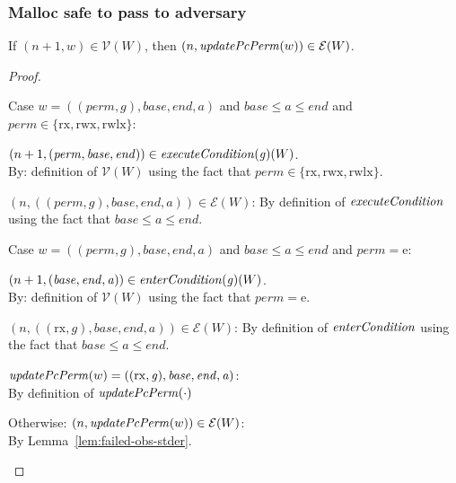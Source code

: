 \documentclass[a4paper]{article}
\newcommand{\var}[1]{\mathit{#1}}
\newcommand{\gl}{\var{g}}
\newcommand{\addr}{\var{a}}
\newcommand{\start}{\var{base}}
\newcommand{\addrend}{\var{end}}
\newcommand{\perm}{\var{perm}}
\newcommand{\stdcap}[1][(\perm,\gl)]{\left(#1,\start,\addrend,\addr \right)}
\newcommand{\plainfun}[2]{
  \ifthenelse{\equal{#2}{}}
  {\mathit{#1}}
  {\mathit{#1}(#2)}
}
\newcommand{\updatePcPerm}[1]{\plainfun{updatePcPerm}{#1}}
\newcommand{\execCond}[1]{\plainfun{executeCondition}{#1}}
\newcommand{\entryCond}[1]{\plainfun{enterCondition}{#1}}
\newcommand{\asmType}{\plaindom{AsmType}}
\newcommand{\plaindom}[1]{\mathrm{#1}}
\newcommand{\intr}[2]{\mathcal{#1}}
\newcommand{\valueintr}[1]{\intr{V}{#1}}
\newcommand{\exprintr}[1]{\intr{E}{#1}}
\newcommand{\stdvr}{\valueintr{\asmType}}
\newcommand{\stder}{\exprintr{\asmType}}
\newcommand{\npair}[2][n]{\left(#1,#2 \right)}
\newcommand{\plainperm}[1]{\mathrm{#1}}
\newcommand{\exec}{\plainperm{rx}}
\newcommand{\entry}{\plainperm{e}}
\newcommand{\rwx}{\plainperm{rwx}}
\newcommand{\rwlx}{\plainperm{rwlx}}
\begin{document}
\subsubsection{Malloc safe to pass to adversary}
\label{sec:malloc-valrel}

\begin{lemma}
  \label{lem:safe-values-safe-invoke}
  If $\npair[n+1]{w} \in \stdvr(W)$, then $\npair{\updatePcPerm{w}} \in \stder(W)$.
\end{lemma}
\begin{proof}
  \begin{enumproof}
  \item Case $w = \stdcap$ and $\start \leq \addr \leq \addrend$
    and $\perm \in \{ \exec,\rwx, \rwlx \}$:
    \begin{enumproof}
    \item $\npair[n+1]{(\perm,\start,\addrend)}\in\execCond{\gl}(W)$.\\
      By: definition of $\stdvr(W)$ using the fact that $\perm \in \{ \exec,\rwx, \rwlx \}$.
    \item $\npair[n]{((\perm,\gl),\start,\addrend,\addr)} \in \stder(W)$:
      By definition of $\execCond{}$ using the fact that $\start \leq \addr \leq \addrend$.
    \end{enumproof}
  \item Case $w = \stdcap$ and $\start \leq \addr \leq \addrend$
    and $\perm = \entry$:
    \begin{enumproof}
    \item $\npair[n+1]{(\start,\addrend,\addr)}\in\entryCond{\gl}(W)$.\\
      By: definition of $\stdvr(W)$ using the fact that $\perm = \entry$.
    \item $\npair[n]{((\exec,\gl),\start,\addrend,\addr)} \in \stder(W)$:
      By definition of $\entryCond{}$ using the fact that $\start \leq \addr \leq \addrend$.
    \item $\updatePcPerm{w} = ((\exec,\gl),\start,\addrend,\addr)$:\\
      By definition of $\updatePcPerm{\cdot}$
    \end{enumproof}
  \item Otherwise:
    $\npair{\updatePcPerm{w}} \in \stder(W)$:\\
    By Lemma~\ref{lem:failed-obs-stder}.
  \end{enumproof}
\end{proof}
\end{document}
